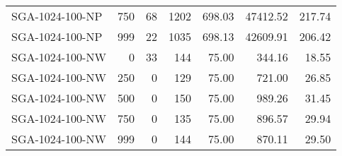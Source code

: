 \begin{table}[htbp]
{\begin{tabular}{lrrrrrr}
    SGA-1024-100-NP & 750    & 68     & 1202   & 698.03 & 47412.52 & 217.74 \\
    SGA-1024-100-NP & 999    & 22     & 1035   & 698.13 & 42609.91 & 206.42 \\ \hline
    SGA-1024-100-NW & 0      & 33     & 144    & 75.00  & 344.16 & 18.55 \\
    SGA-1024-100-NW & 250    & 0      & 129    & 75.00  & 721.00 & 26.85 \\
    SGA-1024-100-NW & 500    & 0      & 150    & 75.00  & 989.26 & 31.45 \\
    SGA-1024-100-NW & 750    & 0      & 135    & 75.00  & 896.57 & 29.94 \\
    SGA-1024-100-NW & 999    & 0      & 144    & 75.00  & 870.11 & 29.50 \\
    \bottomrule
    \end{tabular}}
  \label{tab:addlabel}%
\end{table}%
